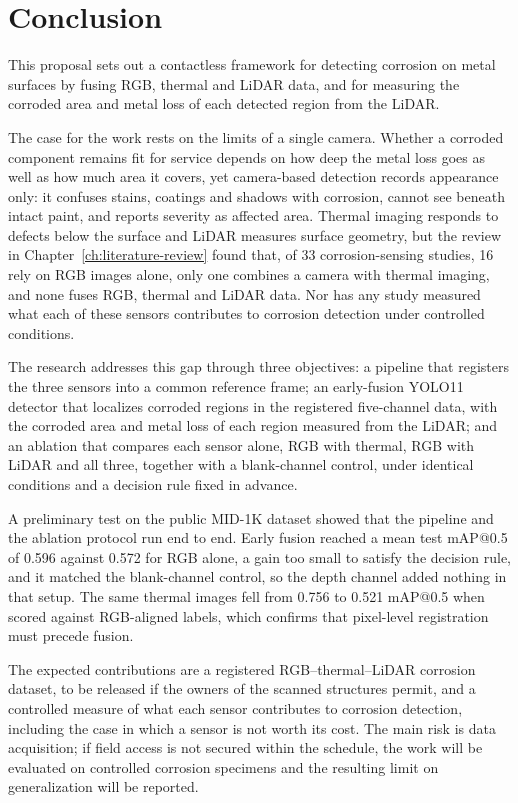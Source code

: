 \chapter[CONCLUSION]{Conclusion}
\label{ch:conclusion}

This proposal sets out a contactless framework for detecting corrosion on metal
surfaces by fusing RGB, thermal and LiDAR data, and for measuring the corroded
area and metal loss of each detected region from the LiDAR.

The case for the work rests on the limits of a single camera. Whether a corroded
component remains fit for service depends on how deep the metal loss goes as
well as how much area it covers, yet camera-based detection records appearance
only: it confuses stains, coatings and shadows with corrosion, cannot see
beneath intact paint, and reports severity as affected area. Thermal imaging
responds to defects below the surface and LiDAR measures surface geometry, but
the review in Chapter~\ref{ch:literature-review} found that, of 33
corrosion-sensing studies, 16 rely on RGB images alone, only one combines a
camera with thermal imaging, and none fuses RGB, thermal and LiDAR data. Nor has
any study measured what each of these sensors contributes to corrosion
detection under controlled conditions.

The research addresses this gap through three objectives: a pipeline that
registers the three sensors into a common reference frame; an early-fusion YOLO11
detector that localizes corroded regions in the registered five-channel data,
with the corroded area and metal loss of each region measured from the LiDAR;
and an ablation that compares each sensor alone, RGB with thermal, RGB with LiDAR
and all three, together with a blank-channel control, under identical conditions
and a decision rule fixed in advance.

A preliminary test on the public MID-1K dataset showed that the pipeline and the
ablation protocol run end to end. Early fusion reached a mean test mAP@0.5 of
0.596 against 0.572 for RGB alone, a gain too small to satisfy the decision
rule, and it matched the blank-channel control, so the depth channel added
nothing in that setup. The same thermal images fell from 0.756 to 0.521 mAP@0.5
when scored against RGB-aligned labels, which confirms that pixel-level
registration must precede fusion.

The expected contributions are a registered RGB--thermal--LiDAR corrosion
dataset, to be released if the owners of the scanned structures permit, and a
controlled measure of what each sensor contributes to corrosion detection,
including the case in which a sensor is not worth its cost. The main risk is
data acquisition; if field access is not secured within the schedule, the work
will be evaluated on controlled corrosion specimens and the resulting limit on
generalization will be reported.
